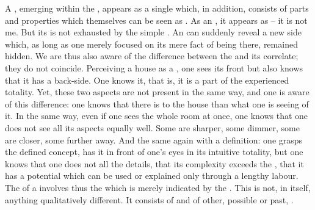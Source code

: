 \pa A , emerging within the \hoa, appears as a single 
which, in addition, consists of parts and properties which themselves can be
seen as . As an , it appears as  -- it is
not me.  But
its  is not exhausted by the simple .  An
 can suddenly reveal a new side which, as long as one merely focused
on its mere fact of being there, remained hidden.  We are thus also
aware of the difference between the  and its correlate; they do
not coincide. Perceiving a house as a , one sees its front but also
knows that it has a back-side. One knows it, that is, it is a part of the
experienced totality.  Yet, these two aspects are not present in the same way,
and one is aware of this difference: one knows that there is  to the house
than what one is  seeing of it.  In the same way, even if one sees the
whole room at once, one knows that one does not see all its aspects equally well.  Some
are sharper, some dimmer, some are closer, some further away. And the same again
with a definition: one grasps the defined concept, has it in front of one's eyes in
its intuitive totality, but one knows that one does not  all the details,
that its complexity exceeds the \hoa, that it has a potential which can be used
or explained only through a lengthy labour. The  of a
 involves thus the  which is merely indicated by the
.  This  is not, in itself, anything qualitatively
different. It consists of  and  of other, possible or
past, .
%

